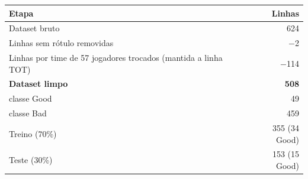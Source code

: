 \begin{tabular}{lr}
\toprule
Etapa & Linhas \\
\midrule
Dataset bruto & 624 \\
Linhas sem rótulo removidas & $-$2 \\
Linhas por time de 57 jogadores trocados (mantida a linha TOT) & $-$114 \\
\textbf{Dataset limpo} & \textbf{508} \\
\quad classe Good & 49 \\
\quad classe Bad & 459 \\
\midrule
Treino (70\%) & 355 (34 Good) \\
Teste (30\%) & 153 (15 Good) \\
\bottomrule
\end{tabular}
